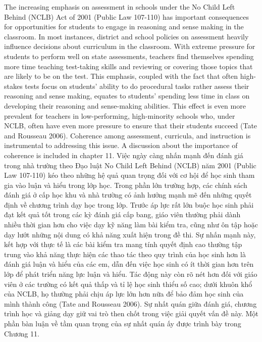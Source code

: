 \documentclass[
  10pt,
  a4paper,
  landscape,
  twoside,
  openany
]{scrbook}
\newcommand{\EN}[1]{#1}
\newcommand{\VI}[1]{#1}
\newcommand{\NOTE}[1]{#1}
\begin{document}
\TriPara
{
\EN{The increasing emphasis on assessment in schools under the No Child Left Behind (NCLB) Act of 2001 (Public Law 107-110) has important consequences for opportunities for students to engage in reasoning and sense making in the classroom. In most instances, district and school policies on assessment heavily influence decisions about curriculum in the classroom. With extreme pressure for students to perform well on state assessments, teachers find themselves spending more time teaching test-taking skills and reviewing or covering those topics that are likely to be on the test. This emphasis, coupled with the fact that often high-stakes tests focus on students' ability to do procedural tasks rather assess their reasoning and sense making, equates to students' spending less time in class on developing their reasoning and sense-making abilities. This effect is even more prevalent for teachers in low-performing, high-minority schools who, under NCLB, often have even more pressure to ensure that their students succeed (Tate and Rousseau 2006). Coherence among assessment, curricula, and instruction is instrumental to addressing this issue. A discussion about the importance of coherence is included in chapter 11.}
}
{
\VI{Việc ngày càng nhấn mạnh đến đánh giá trong nhà trường theo Đạo luật No Child Left Behind (NCLB) năm 2001 (Public Law 107-110) kéo theo những hệ quả quan trọng đối với cơ hội để học sinh tham gia vào luận và hiểu trong lớp học. Trong phần lớn trường hợp, các chính sách đánh giá ở cấp học khu và nhà trường có ảnh hưởng mạnh mẽ đến những quyết định về chương trình dạy học trong lớp. Trước áp lực rất lớn buộc học sinh phải đạt kết quả tốt trong các kỳ đánh giá cấp bang, giáo viên thường phải dành nhiều thời gian hơn cho việc dạy kỹ năng làm bài kiểm tra, cũng như ôn tập hoặc dạy lướt những nội dung có khả năng xuất hiện trong đề thi. Sự nhấn mạnh này, kết hợp với thực tế là các bài kiểm tra mang tính quyết định cao thường tập trung vào khả năng thực hiện các thao tác theo quy trình của học sinh hơn là đánh giá luận và hiểu của các em, dẫn đến việc học sinh có ít thời gian hơn trên lớp để phát triển năng lực luận và hiểu. Tác động này còn rõ nét hơn đối với giáo viên ở các trường có kết quả thấp và tỉ lệ học sinh thiểu số cao; dưới khuôn khổ của NCLB, họ thường phải chịu áp lực lớn hơn nữa để bảo đảm học sinh của mình thành công (Tate and Rousseau 2006). Sự nhất quán giữa đánh giá, chương trình học và giảng dạy giữ vai trò then chốt trong việc giải quyết vấn đề này. Một phần bàn luận về tầm quan trọng của sự nhất quán ấy được trình bày trong Chương 11.}
}
{
\NOTE{}
}
\end{document}
